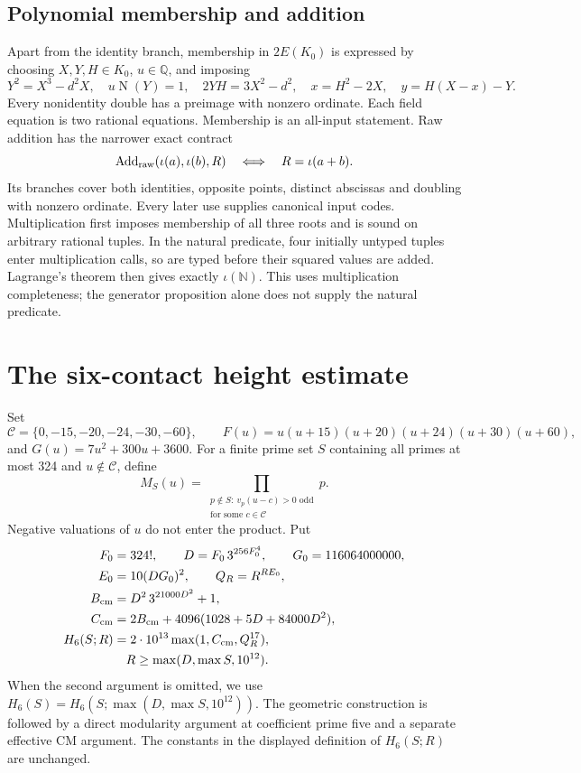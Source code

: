 \documentclass[11pt]{article}
\theoremstyle{definition}
\theoremstyle{remark}
\newcommand{\Q}{\mathbb Q}
\newcommand{\N}{\mathbb N}
\newcommand{\Cset}{\mathcal C}
\newcommand{\Norm}{\operatorname{N}}
\begin{document}
\subsection{Polynomial membership and addition}
Apart from the identity branch, membership in $2E(K_0)$ is expressed by
choosing $X,Y,H\in K_0$, $u\in\Q$, and imposing
\[
 Y^2=X^3-d^2X,\quad u\Norm(Y)=1,\quad2YH=3X^2-d^2,
 \quad x=H^2-2X,\quad y=H(X-x)-Y.
\]
Every nonidentity double has a preimage with nonzero ordinate.
Each field equation is two rational equations. Membership is an all-input
statement. Raw addition has the narrower exact contract
\[
 \operatorname{Add}_{\rm raw}(\iota(a),\iota(b),R)
             \quad\Longleftrightarrow\quad R=\iota(a+b).
\]
Its branches cover both identities, opposite points, distinct abscissas
and doubling with nonzero ordinate. Every later use supplies canonical
input codes. Multiplication first imposes membership of all three roots
and is sound on arbitrary rational tuples. In the natural predicate,
four initially untyped tuples enter multiplication calls, so are typed
before their squared values are added. Lagrange's theorem then gives
exactly $\iota(\N)$. This uses multiplication completeness; the generator
proposition alone does not supply the natural predicate.



\section{The six-contact height estimate}\label{sec:height}
Set
\[
 \Cset=\{0,-15,-20,-24,-30,-60\},\qquad
 F(u)=u(u+15)(u+20)(u+24)(u+30)(u+60),
\]
and $G(u)=7u^2+300u+3600$. For a finite prime set $S$ containing all
primes at most 324 and $u\notin\Cset$, define
\[
 M_S(u)=\prod_{\substack{p\notin S:\ v_p(u-c)>0\text{ odd}\\
                          \text{for some }c\in\Cset}}p.
\]
Negative valuations of $u$ do not enter the product. Put
\begin{align*}
 F_0&=324!,\qquad D=F_0\,3^{256F_0^4},\qquad G_0=116064000000,\\
 E_0&=10(DG_0)^2,\qquad Q_R=R^{RE_0},\\
 B_{\rm cm}&=D^2\,3^{21000D^2}+1,\\
 C_{\rm cm}&=2B_{\rm cm}+4096(1028+5D+84000D^2),\\
 H_6(S;R)&=2\cdot10^{13}\max(1,C_{\rm cm},Q_R^{17}),\\
 &\hspace{1em}R\ge\max(D,\max S,10^{12}).
\end{align*}
When the second argument is omitted, we use
$H_6(S)=H_6(S;\max(D,\max S,10^{12}))$.
The geometric construction is followed by a direct modularity argument
at coefficient prime five and a separate effective CM argument. The
constants in the displayed definition of $H_6(S;R)$ are unchanged.
\end{document}
